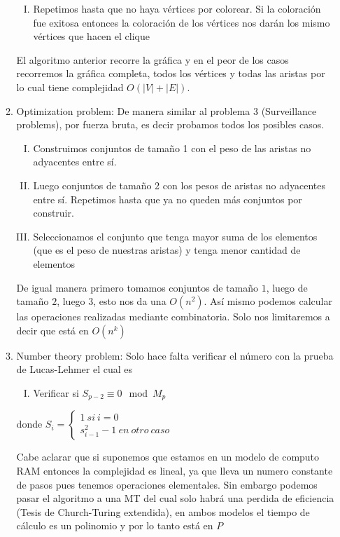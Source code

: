 \documentclass[12pt,letterpaper]{article}
\begin{document}
\begin{itemize}
\begin{enumerate}
\begin{enumerate}[I.]
        
        \item Repetimos hasta que no haya vértices por colorear. Si la coloración fue exitosa entonces la coloración de los vértices nos darán los mismo vértices que hacen el clique
    \end{enumerate}
    El algoritmo anterior recorre la gráfica y en el peor de los casos recorremos la gráfica completa, todos los vértices y todas las aristas por lo cual tiene complejidad $O(|V| + |E|)$.
    \newpage
    \item Optimization problem:
    De manera similar al problema 3 (Surveillance problems), por fuerza bruta, es decir probamos todos los posibles casos.
    \begin{enumerate}[I.]
        \item Construimos conjuntos de tamaño 1 con el peso de las aristas no adyacentes entre sí.
        
        \item Luego conjuntos de tamaño 2 con los pesos de aristas no adyacentes entre sí.
        Repetimos hasta que ya no queden más conjuntos por construir.
        
        \item Seleccionamos el conjunto que tenga mayor suma de los elementos (que es el peso de nuestras aristas) y tenga menor cantidad de elementos
    \end{enumerate}
    De igual manera primero tomamos conjuntos de tamaño $1$, luego de tamaño $2$, luego $3$, esto nos da una $O(n^2)$. Así mismo podemos calcular las operaciones realizadas mediante combinatoria. Solo nos limitaremos a decir que está en $O(n^k)$
    
    \item Number theory problem:
    Solo hace falta verificar el número con la prueba de Lucas-Lehmer el cual es
    \begin{enumerate}[I.]
        \item Verificar si $S_{p-2} \equiv 0 \mod M_p$
    \end{enumerate}
    donde 
    $S_{i}=\left\lbrace\begin{array}{c} 1~si~i =0\\ s^2_{i-1}-1~en~otro~caso \end{array}\right.$
    
    Cabe aclarar que si suponemos que estamos en un modelo de computo RAM entonces la complejidad es lineal, ya que lleva un numero constante de pasos pues tenemos operaciones elementales. Sin embargo podemos pasar el algoritmo a una MT del cual solo habrá una perdida de eficiencia (Tesis de Church-Turing extendida), en ambos modelos el tiempo de cálculo es un polinomio y por lo tanto está en $P$
\end{enumerate}


\end{itemize}
\end{document}
